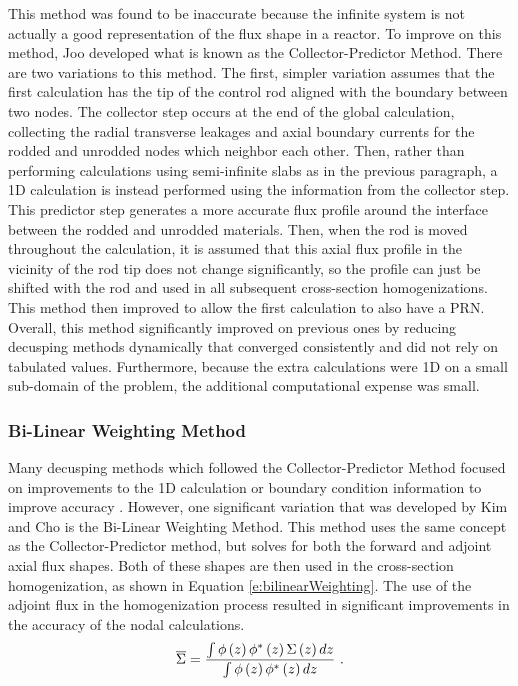This method was found to be inaccurate because the infinite system is not actually a good representation of the flux shape in a reactor.  To improve on this method, Joo developed what is known as the Collector-Predictor Method.  There are two variations to this method.  The first, simpler variation assumes that the first calculation has the tip of the control rod aligned with the boundary between two nodes.  The collector step occurs at the end of the global calculation, collecting the radial transverse leakages and axial boundary currents for the rodded and unrodded nodes which neighbor each other.  Then, rather than performing calculations using semi-infinite slabs as in the previous paragraph, a 1D calculation is instead performed using the information from the collector step.  This predictor step generates a more accurate flux profile around the interface between the rodded and unrodded materials.  Then, when the rod is moved throughout the calculation, it is assumed that this axial flux profile in the vicinity of the rod tip does not change significantly, so the profile can just be shifted with the rod and used in all subsequent cross-section homogenizations.  This method then improved to allow the first calculation to also have a PRN.  Overall, this method significantly improved on previous ones by reducing decusping methods dynamically that converged consistently and did not rely on tabulated values.  Furthermore, because the extra calculations were 1D on a small sub-domain of the problem, the additional computational expense was small.

\subsubsection{Bi-Linear Weighting Method}

Many decusping methods which followed the Collector-Predictor Method focused on improvements to the 1D calculation or boundary condition information to improve accuracy \cite{gehinThesis1992quasi,smith1992enhancementsStudxvickCoreManagementSystem,lee1998CuspingCorrection1DFineMeshFluxProfiles,downar2004PARCStheory}.  However, one significant variation that was developed by Kim and Cho \cite{kim1990BilinearWeighting} is the Bi-Linear Weighting Method.  This method uses the same concept as the Collector-Predictor method, but solves for both the forward and adjoint axial flux shapes.  Both of these shapes are then used in the cross-section homogenization, as shown in Equation \ref{e:bilinearWeighting}.  The use of the adjoint flux in the homogenization process resulted in significant improvements in the accuracy of the nodal calculations.
\begin{equation}\label{e:bilinearWeighting}
\overline{\Sigma} = \frac{\intop \phi\left(z\right) \phi^*\left(z\right) \Sigma\left(z\right) dz}{\intop \phi\left(z\right) \phi^*\left(z\right) dz}\ .
\end{equation}


